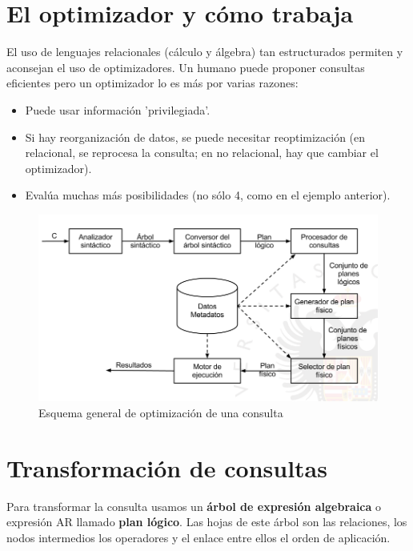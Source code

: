 \begin{example}
\section{El optimizador y cómo trabaja}

El uso de lenguajes relacionales (cálculo y álgebra) tan estructurados permiten y aconsejan el uso de optimizadores. Un humano puede proponer consultas eficientes pero un optimizador lo es más por varias razones:
\begin{itemize}
\item Puede usar información 'privilegiada'.
\item Si hay reorganización de datos, se puede necesitar reoptimización (en relacional, se reprocesa la consulta; en no relacional, hay que cambiar el optimizador).
\item Evalúa muchas más posibilidades (no sólo 4, como en el ejemplo anterior).
\end{itemize}


\begin{figure}[H]
  \center
  \includegraphics[scale=0.4]{img/1.png}
  \caption{Esquema general de optimización de una consulta}
\end{figure}

\section{Transformación de consultas}

Para transformar la consulta usamos un \textbf{árbol de expresión algebraica} o expresión AR llamado \textbf{plan lógico}. Las hojas de este árbol son las relaciones, los nodos intermedios los operadores y el enlace entre ellos el orden de aplicación.


\end{example}
